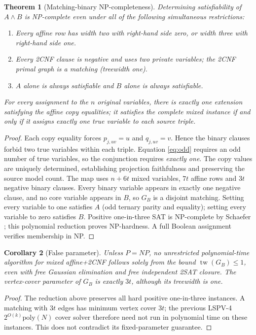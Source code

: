 \documentclass[11pt]{article}
\newtheorem{theorem}{Theorem}
\newtheorem{corollary}[theorem]{Corollary}
\begin{document}
\begin{theorem}[Matching-binary NP-completeness]\label{thm:hard}
Determining satisfiability of $A\wedge B$ is NP-complete even under all of the following simultaneous restrictions:
\begin{enumerate}
\item[] Every affine row has width two with right-hand side zero, or width three with right-hand side one.
\item[] Every 2CNF clause is negative and uses two private variables; the 2CNF primal graph is a matching (treewidth one).
\item[] $A$ alone is always satisfiable and $B$ alone is always satisfiable.
\end{enumerate}
For every assignment to the $n$ original variables, there is exactly one extension satisfying the affine copy equalities; it satisfies the complete mixed instance if and only if it assigns exactly one true variable to each source triple.
\end{theorem}
\begin{proof}
Each copy equality forces $p_{j,uv}=u$ and $q_{j,uv}=v$. Hence the binary clauses forbid two true variables within each triple. Equation \eqref{eq:odd} requires an odd number of true variables, so the conjunction requires \emph{exactly one}. The copy values are uniquely determined, establishing projection faithfulness and preserving the source model count. The map uses $n+6t$ mixed variables, $7t$ affine rows and $3t$ negative binary clauses. Every binary variable appears in exactly one negative clause, and no core variable appears in $B$, so $G_B$ is a disjoint matching. Setting every variable to one satisfies $A$ (odd ternary parity and equality); setting every variable to zero satisfies $B$. Positive one-in-three SAT is NP-complete by Schaefer \cite{schaefer1978}; this polynomial reduction proves NP-hardness. A full Boolean assignment verifies membership in NP.
\end{proof}

\begin{corollary}[False parameter]\label{cor:wrongwidth}
Unless $P=NP$, no unrestricted polynomial-time algorithm for mixed affine+2CNF follows solely from the bound $\operatorname{tw}(G_B)\le1$, even with free Gaussian elimination and free independent 2SAT closure. The vertex-cover parameter of $G_B$ is exactly $3t$, although its treewidth is one.
\end{corollary}
\begin{proof}
The reduction above preserves all hard positive one-in-three instances. A matching with $3t$ edges has minimum vertex cover $3t$; the previous LSPV-4 $2^{O(k)}\mathrm{poly}(N)$ cover solver therefore need not run in polynomial time on these instances. This does not contradict its fixed-parameter guarantee.
\end{proof}
\end{document}
